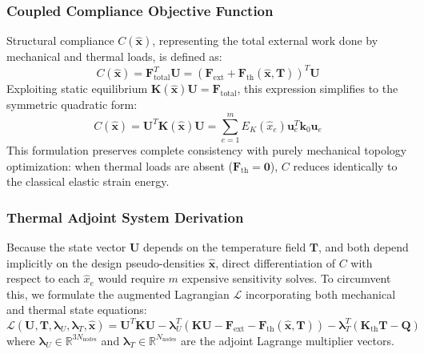 \documentclass[11pt, a4paper]{article}
\begin{document}
\subsubsection{Coupled Compliance Objective Function}
Structural compliance $C(\hat{\mathbf{x}})$, representing the total external work done by mechanical and thermal loads, is defined as:
\begin{equation}
C(\hat{\mathbf{x}}) = \mathbf{F}_{\text{total}}^T \mathbf{U} = \left( \mathbf{F}_{\text{ext}} + \mathbf{F}_{\text{th}}(\hat{\mathbf{x}}, \mathbf{T}) \right)^T \mathbf{U}
\end{equation}
Exploiting static equilibrium $\mathbf{K}(\hat{\mathbf{x}}) \mathbf{U} = \mathbf{F}_{\text{total}}$, this expression simplifies to the symmetric quadratic form:
\begin{equation}
C(\hat{\mathbf{x}}) = \mathbf{U}^T \mathbf{K}(\hat{\mathbf{x}}) \mathbf{U} = \sum_{e=1}^m E_K(\hat{x}_e) \mathbf{u}_e^T \mathbf{k}_0 \mathbf{u}_e
\end{equation}
This formulation preserves complete consistency with purely mechanical topology optimization: when thermal loads are absent ($\mathbf{F}_{\text{th}} = \mathbf{0}$), $C$ reduces identically to the classical elastic strain energy.

\subsubsection{Thermal Adjoint System Derivation}
Because the state vector $\mathbf{U}$ depends on the temperature field $\mathbf{T}$, and both depend implicitly on the design pseudo-densities $\hat{\mathbf{x}}$, direct differentiation of $C$ with respect to each $\hat{x}_e$ would require $m$ expensive sensitivity solves. To circumvent this, we formulate the augmented Lagrangian $\mathcal{L}$ incorporating both mechanical and thermal state equations:
\begin{equation}
\mathcal{L}(\mathbf{U}, \mathbf{T}, \boldsymbol{\lambda}_U, \boldsymbol{\lambda}_T, \hat{\mathbf{x}}) = \mathbf{U}^T \mathbf{K} \mathbf{U} - \boldsymbol{\lambda}_U^T \left( \mathbf{K} \mathbf{U} - \mathbf{F}_{\text{ext}} - \mathbf{F}_{\text{th}}(\hat{\mathbf{x}}, \mathbf{T}) \right) - \boldsymbol{\lambda}_T^T \left( \mathbf{K}_{\text{th}} \mathbf{T} - \mathbf{Q} \right)
\end{equation}
where $\boldsymbol{\lambda}_U \in \mathbb{R}^{3 N_{\text{nodes}}}$ and $\boldsymbol{\lambda}_T \in \mathbb{R}^{N_{\text{nodes}}}$ are the adjoint Lagrange multiplier vectors.
\end{document}
